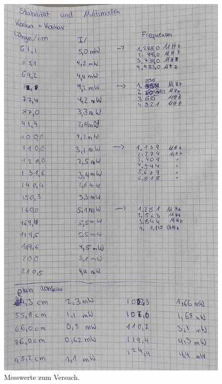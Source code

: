 \begin{figure}[h]
    \centering
     \includegraphics[scale=0.4]{Abbildungen/Kladde3.jpg}
    \caption{Messwerte zum Versuch.}
\end{figure}

\pagebreak
